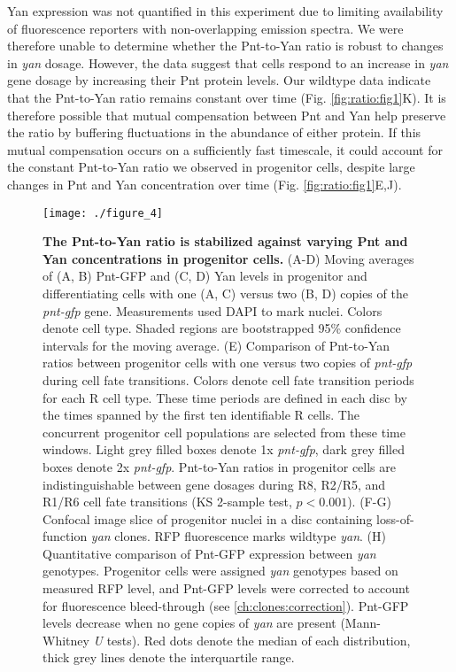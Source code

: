 Yan expression was not quantified in this experiment due to limiting availability of fluorescence reporters with non-overlapping emission spectra. We were therefore unable to determine whether the Pnt-to-Yan ratio is robust to changes in \textit{yan} dosage. However, the data suggest that cells respond to an increase in \textit{yan} gene dosage by increasing their Pnt protein levels. Our wildtype data indicate that the Pnt-to-Yan ratio remains constant over time (Fig. \ref{fig:ratio:fig1}K). It is therefore possible that mutual compensation between Pnt and Yan help preserve the ratio by buffering fluctuations in the abundance of either protein. If this mutual compensation occurs on a sufficiently fast timescale, it could account for the constant Pnt-to-Yan ratio we observed in progenitor cells, despite large changes in Pnt and Yan concentration over time (Fig. \ref{fig:ratio:fig1}E,J).

\begin{figure}[p!]
\centering
\texttt{[image: ./figure\_4]}
\caption[P:Y ratio is stabilized against varying Pnt and Yan concentrations.]{\textbf{The Pnt-to-Yan ratio is stabilized against varying Pnt and Yan concentrations in progenitor cells.} (A-D) Moving averages of (A, B) Pnt-GFP and (C, D) Yan levels in progenitor and differentiating cells with one (A, C) versus two (B, D) copies of the \textit{pnt-gfp} gene. Measurements used DAPI to mark nuclei. Colors denote cell type. Shaded regions are bootstrapped 95\% confidence intervals for the moving average. (E) Comparison of Pnt-to-Yan ratios between progenitor cells with one versus two copies of \textit{pnt-gfp} during cell fate transitions. Colors denote cell fate transition periods for each R cell type. These time periods are defined in each disc by the times spanned by the first ten identifiable R cells. The concurrent progenitor cell populations are selected from these time windows. Light grey filled boxes denote 1x \textit{pnt-gfp}, dark grey filled boxes denote 2x \textit{pnt-gfp}. Pnt-to-Yan ratios in progenitor cells are indistinguishable between gene dosages during R8, R2/R5, and R1/R6 cell fate transitions (KS 2-sample test, $p<0.001$). (F-G) Confocal image slice of progenitor nuclei in a disc containing loss-of-function \textit{yan} clones. RFP fluorescence marks wildtype \textit{yan}. (H) Quantitative comparison of Pnt-GFP expression between \textit{yan} genotypes. Progenitor cells were assigned \textit{yan} genotypes based on measured RFP level, and Pnt-GFP levels were corrected to account for fluorescence bleed-through (see \ref{ch:clones:correction}). Pnt-GFP levels decrease when no gene copies of \textit{yan} are present (Mann-Whitney \textit{U} tests). Red dots denote the median of each distribution, thick grey lines denote the interquartile range.}
\label{fig:ratio:fig4}
\end{figure}

